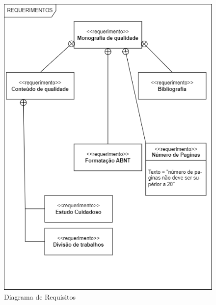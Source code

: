 \begin{figure}[h]
\centering
\includegraphics[width=\textwidth/2,height=\textheight,keepaspectratio]{figures/diagrama de requistos exemplo 1.png}
\caption{Diagrama de Requisitos}
\label{fig:package_diagram}
\end{figure}

